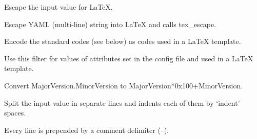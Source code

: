 \documentclass[letterpaper,10pt,english]{sphinxmanual}
\begin{document}

\begin{fulllineitems}
\label{\detokenize{developer:wuppercodegen.filter.tex_escape}}
Escape the input value for LaTeX.

\end{fulllineitems}


\begin{fulllineitems}
\label{\detokenize{developer:wuppercodegen.filter.tex_string}}
Escape YAML (multi-line) string into LaTeX and calls tex\_escape.

\end{fulllineitems}


\begin{fulllineitems}
\label{\detokenize{developer:wuppercodegen.filter.tex_yaml_encode}}
Encode the standard codes (see below) as codes used in a LaTeX template.

Use this filter for values of attributes set in the config file and used in a LaTeX
template.

\end{fulllineitems}


\begin{fulllineitems}
\label{\detokenize{developer:wuppercodegen.filter.version}}
Convert MajorVersion.MinorVersion to MajorVersion*0x100+MinorVersion.

\end{fulllineitems}


\begin{fulllineitems}
\label{\detokenize{developer:wuppercodegen.filter.vhdl_comment}}
Split the input value in separate lines and indents each of them by `indent' spaces.

Every line is prepended by a comment delimiter (--).

\end{fulllineitems}
\end{document}
